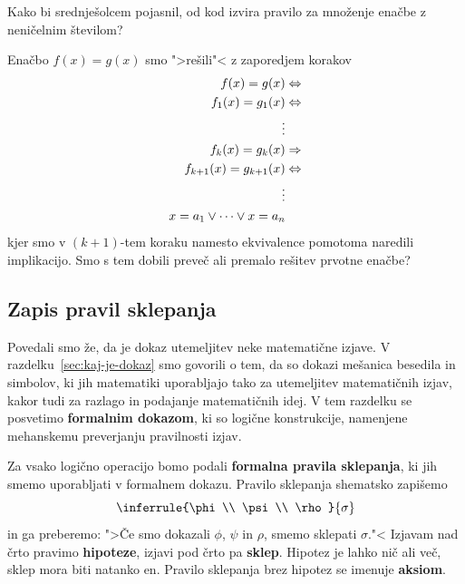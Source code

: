 \begin{vaja}
  Kako bi srednješolcem pojasnil, od kod izvira pravilo za množenje
  enačbe z neničelnim številom?
\end{vaja}

\begin{vaja}
  Enačbo $f(x) = g(x)$ smo ">rešili"< z zaporedjem korakov
  \begin{align*}
    f(x) = g(x) &\Leftrightarrow \\
    f_1(x) = g_1(x) &\Leftrightarrow \\
    \vdots & \\
    f_k(x) = g_k(x) &\Rightarrow \\
    f_{k+1}(x) = g_{k+1}(x) &\Leftrightarrow \\
    \vdots & \\
    x = a_1 \lor \cdots \lor x = a_n
  \end{align*}
  kjer smo v $(k+1)$-tem koraku namesto ekvivalence pomotoma naredili
  implikacijo. Smo s tem dobili preveč ali premalo rešitev prvotne
  enačbe?
\end{vaja}

\label{sec:formalna-pravila}

\subsection{Zapis pravil sklepanja}

Povedali smo že, da je dokaz utemeljitev neke matematične izjave. V
razdelku~\ref{sec:kaj-je-dokaz} smo govorili o tem, da so dokazi
mešanica besedila in simbolov, ki jih matematiki uporabljajo tako za
utemeljitev matematičnih izjav, kakor tudi za razlago in podajanje
matematičnih idej. V tem razdelku se posvetimo \textbf{formalnim
  dokazom}, ki so logične konstrukcije, namenjene mehanskemu
preverjanju pravilnosti izjav.

Za vsako logično operacijo bomo podali \textbf{formalna pravila
  sklepanja}, ki jih smemo uporabljati v formalnem dokazu. Pravilo
sklepanja shematsko zapišemo
%
\begin{equation*}
  \inferrule{\phi \\ \psi \\ \rho}{\sigma}
\end{equation*}
%
in ga preberemo: ">Če smo dokazali $\phi$, $\psi$ in $\rho$, smemo
sklepati $\sigma$."< Izjavam nad črto pravimo \textbf{hipoteze}, izjavi
pod črto pa \textbf{sklep}. Hipotez je lahko nič ali več, sklep mora
biti natanko en. Pravilo sklepanja brez hipotez se imenuje
\textbf{aksiom}.

